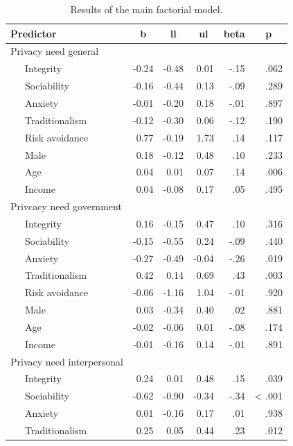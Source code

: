 \documentclass[man,floatsintext]{apa6}
\theoremstyle{definition}
\theoremstyle{definition}
\theoremstyle{definition}
\theoremstyle{remark}
\begin{document}
\begin{table}[tbp]
\begin{center}
\begin{threeparttable}
\caption{\label{tab:results}Results of the main factorial model.}
\scriptsize{
\begin{tabular}{lrrrrr}
\toprule
Predictor & \multicolumn{1}{c}{b} & \multicolumn{1}{c}{ll} & \multicolumn{1}{c}{ul} & \multicolumn{1}{c}{beta} & \multicolumn{1}{c}{p}\\
\midrule
Privacy need general &  &  &  &  & \\
\ \ \ Integrity & -0.24 & -0.48 & 0.01 & -.15 & .062\\
\ \ \ Sociability & -0.16 & -0.44 & 0.13 & -.09 & .289\\
\ \ \ Anxiety & -0.01 & -0.20 & 0.18 & -.01 & .897\\
\ \ \ Traditionalism & -0.12 & -0.30 & 0.06 & -.12 & .190\\
\ \ \ Risk avoidance & 0.77 & -0.19 & 1.73 & .14 & .117\\
\ \ \ Male & 0.18 & -0.12 & 0.48 & .10 & .233\\
\ \ \ Age & 0.04 & 0.01 & 0.07 & .14 & .006\\
\ \ \ Income & 0.04 & -0.08 & 0.17 & .05 & .495\\
Privcacy need government &  &  &  &  & \\
\ \ \ Integrity & 0.16 & -0.15 & 0.47 & .10 & .316\\
\ \ \ Sociability & -0.15 & -0.55 & 0.24 & -.09 & .440\\
\ \ \ Anxiety & -0.27 & -0.49 & -0.04 & -.26 & .019\\
\ \ \ Traditionalism & 0.42 & 0.14 & 0.69 & .43 & .003\\
\ \ \ Risk avoidance & -0.06 & -1.16 & 1.04 & -.01 & .920\\
\ \ \ Male & 0.03 & -0.34 & 0.40 & .02 & .881\\
\ \ \ Age & -0.02 & -0.06 & 0.01 & -.08 & .174\\
\ \ \ Income & -0.01 & -0.16 & 0.14 & -.01 & .891\\
Privacy need interpersonal &  &  &  &  & \\
\ \ \ Integrity & 0.24 & 0.01 & 0.48 & .15 & .039\\
\ \ \ Sociability & -0.62 & -0.90 & -0.34 & -.34 & < .001\\
\ \ \ Anxiety & 0.01 & -0.16 & 0.17 & .01 & .938\\
\ \ \ Traditionalism & 0.25 & 0.05 & 0.44 & .23 & .012\\

\end{tabular}}
\end{threeparttable}
\end{center}
\end{table}
\end{document}
